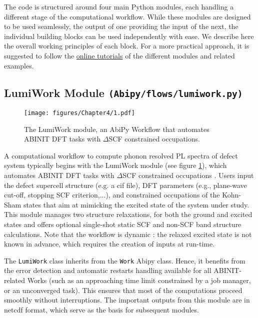 The code is structured around four main Python modules, each handling a different stage of the computational workflow. While these modules are designed  to be used seamlessly, the output of one providing the input of the next, the individual building blocks can be used independently with ease. We describe here the overall working principles of each block. For a more practical approach, it is suggested to follow the \href{https://jbouquiaux.github.io/lumi_book/intro.html}{online tutorials} of the different modules and related examples.  

\subsection*{LumiWork Module \texttt{(Abipy/flows/lumiwork.py)}}

\begin{figure}[h!]
	\centering
	\texttt{[image: figures/Chapter4/1.pdf]}
	\caption[LumiWork module]{The LumiWork module, an AbiPy Workflow that automates ABINIT DFT tasks with $\Delta$SCF constrained occupations.}
	\label{fig:LumiWork}
\end{figure}

A computational workflow to compute phonon resolved PL spectra of defect system typically begins with the LumiWork module (see figure \ref{fig:LumiWork}), which automates ABINIT DFT tasks with $\Delta$SCF constrained occupations \cite{jones1989density,hellman2004potential}. Users input the defect supercell structure (e.g. a cif file), DFT parameters (e.g., plane-wave cut-off, stopping SCF criterion,...), and constrained occupations of the Kohn-Sham states that aim at mimicking the excited state of the system under study. This module manages two structure relaxations, for both the ground and excited states and offers optional single-shot static SCF and non-SCF band structure calculations. Note that the workflow is dynamic : the relaxed excited state is not known in advance, which requires the creation of inputs at run-time. 

The \texttt{LumiWork} class inherits from the \texttt{Work} Abipy class. Hence, it benefits from the error detection and automatic restarts handling available for all ABINIT-related Works (such as an approaching time limit constrained by a job manager, or an unconverged task). This ensures that most of the computations proceed smoothly without interruptions. The important outputs from this module are in netcdf format, which serve as the basis for subsequent modules. 

